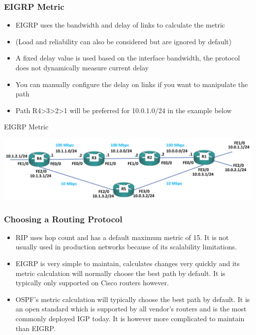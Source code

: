 \documentclass[pdflatex,compress,mathserif]{beamer}
\begin{document}
\begin{frame}
	\frametitle{EIGRP Metric}
	\begin{itemize}
		\item EIGRP uses the bandwidth and delay of links to calculate the metric
		\item (Load and reliability can also be considered but are ignored by default)
		\item A fixed delay value is used based on the interface bandwidth, the protocol does
not dynamically measure current delay
		\item You can manually configure the delay on links if you want to manipulate the path
		\item Path R4>3>2>1 will be preferred for 10.0.1.0/24 in the example below
	\end{itemize}
\end{frame}

\begin{frame}{EIGRP Metric}
	\begin{center}
		\includegraphics[width=\linewidth]{img/img22}
	\end{center}
\end{frame}

\begin{frame}
	\frametitle{Choosing a Routing Protocol}
	\begin{itemize}
		\item RIP uses hop count and has a default maximum metric of 15. It is not
usually used in production networks because of its scalability limitations.
		\item EIGRP is very simple to maintain, calculates changes very quickly and its
metric calculation will normally choose the best path by default. It is
typically only supported on Cisco routers however.
		\item OSPF’s metric calculation will typically choose the best path by default. It
is an open standard which is supported by all vendor’s routers and is the
most commonly deployed IGP today. It is however more complicated to
maintain than EIGRP.
	\end{itemize}
\end{frame}
\end{document}
